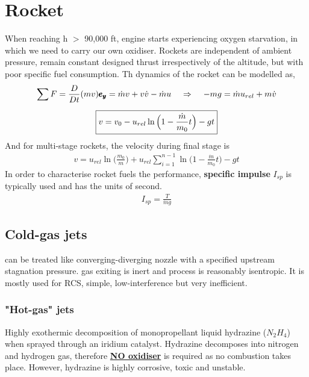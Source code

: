 \documentclass[a4paper,10pt]{article}
\begin{document}
\section{Rocket}
When reaching h $>$ 90,000 ft, engine starts experiencing oxygen starvation, in which we need to carry our own oxidiser. Rockets are independent of ambient pressure, remain constant designed thrust irrespectively of the altitude, but with poor specific fuel consumption. Th dynamics of the rocket can be modelled as, 
\begin{gather*}
    \sum F = \frac{D}{Dt}(mv)\pmb{e_y} = \dot{m}v+v\dot{v}-\dot{m}u\hspace*{0.4cm}\Rightarrow\hspace*{0.4cm}-mg = \dot{m}u_{rel}+m\dot{v}\\[0.2cm]
    \boxed{v = v_0-u_{rel}\ln\Big(1-\frac{\dot{m}}{m_0}t\Big)-gt}
\end{gather*}
And for multi-stage rockets, the velocity during final stage is
\begin{gather*}
    \boxed{v = u_{rel}\ln\Big(\frac{m_0}{m}\Big) + u_{rel}\sum_{i=1}^{n-1}\ln\Bigg(1-\frac{\dot{m}}{m_0}t\Bigg)-gt}
\end{gather*}
In order to characterise rocket fuels the performance, \textbf{specific impulse} $I_{sp}$ is typically used and has the units of second. 
\begin{gather*}
    I_{sp} = \frac{T}{\dot{m}g}
\end{gather*}

\vspace*{-0.3cm}
\subsection{Cold-gas jets}
can be treated like converging-diverging nozzle with a specified upstream stagnation pressure. gas exiting is inert and process is reasonably isentropic. It is mostly used for RCS, simple, low-interference but very inefficient.

\vspace*{-0.3cm}
\subsubsection{"Hot-gas" jets}
Highly exothermic decomposition of monopropellant liquid hydrazine ($N_2H_4$) when sprayed through an iridium catalyst. Hydrazine decomposes into nitrogen and hydrogen gas, therefore \underline{\textbf{NO oxidiser}} is required as no combustion takes place. However, hydrazine is highly corrosive, toxic and unstable. 
\end{document}
